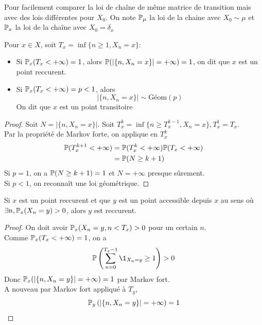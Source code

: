 \documentclass[]{report}
\begin{document}
    \begin{re}{}{}
        Pour facilement comparer la loi de chaîne de même matrice de transition mais avec des lois différentes pour $X_0$.
        On note $\mathbb{P}_\mu$ la loi de la chaine avec $X_0\sim \mu$ et $\mathbb{P}_x$ la loi de la chaîne avec $X_0=\delta_x$
    \end{re}

    \begin{df}{}{}
        Pour $x\in X$, soit $T_x=\inf\{n\ge 1,X_n=x\}$:\\
        \begin{itemize}
            \item Si $\mathbb{P}_x(T_x<+\infty)=1$, alors $\mathbb{P}(|\{n,X_n=x\}|=+\infty)=1$, on dit que $x$ est un point reccurent.
            \item Si $\mathbb{P}_x(T_x<+\infty)=p<1$, alors
            \[\left|\{n,X_n=x\}\right|\sim \text{Géom}(p)\]
            On dit que $x$ est un point transitoire
        \end{itemize}
    \end{df}

    \begin{proof}
        Soit $N=\left|\{n,X_n=x\}\right|$. Soit $T_x^k=\inf\{n\ge T_x^{k-1},X_n=x\},T_x^1=T_x$.\\
        Par la propriété de Markov forte, on applique en $T_x^k$
        \begin{align*}
            \mathbb{P}(T_x^{k+1}<+\infty)&=\mathbb{P}(T_x^{k}<+\infty)\mathbb{P}(T_x<+\infty)\\
            &=\mathbb{P}(N\ge k+1)
        \end{align*}
        Si $p=1$, on a $\mathbb{P}(N\ge k+1)=1$ et $N=+\infty$ presque sûrement.\\
        Si $p<1$, on reconnaît une loi géométrique.
    \end{proof}

    \begin{prop}{}{}
        Si $x$ est un point reccurent et que $y$ est un point accessible depuis $x$ au sens où $\exists n,\mathbb{P}_x(X_n=y)>0$, alors $y$ est reccurent.
    \end{prop}

    \begin{proof}
        On doit avoir $\mathbb{P}_x(X_n=y,n<T_x)>0$ pour un certain $n$.\\
        Comme $\mathbb{P}_x(T_x<+\infty)=1$, on a
        \begin{align*}
            \Pa\left(\sum_{n=0}^{T_x-1}\1_{X_n=y}\ge 1\right)>0
        \end{align*}
        Donc $\mathbb{P}_x(\left|\{n,X_n=y\}\right|=+\infty)=1$ par Markov fort.\\
        A nouveau par Markov fort appliqué à $T_y$,
        \[\mathbb{P}_y\left(\left|\{n,X_n=y\}\right|=+\infty\right)=1\]
    \end{proof}
\end{document}
